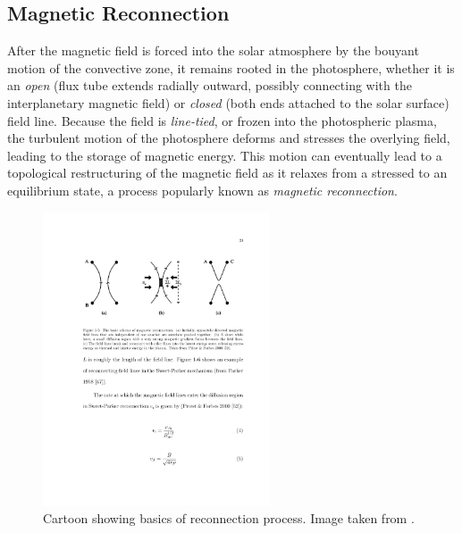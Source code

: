\subsection{Magnetic Reconnection}
\label{subsec:magnetic_reconnection}
\par After the magnetic field is forced into the solar atmosphere by the bouyant motion of the convective zone, it remains rooted in the photosphere, whether it is an \textit{open} (flux tube extends radially outward, possibly connecting with the interplanetary magnetic field) or \textit{closed} (both ends attached to the solar surface) field line. Because the field is \textit{line-tied}, or frozen into the photospheric plasma, the turbulent motion of the photosphere deforms and stresses the overlying field, leading to the storage of magnetic energy. This motion can eventually lead to a topological restructuring of the magnetic field as it relaxes from a stressed to an equilibrium state, a process popularly known as \textit{magnetic reconnection}.
%
\begin{figure}[htbp]
	\centering
	\includegraphics[width=0.6\textwidth]{figures/reconnection_cartoon.pdf}
	\caption{Cartoon showing basics of reconnection process. Image taken from \citet{priest_magnetic_2000}.}
	\label{fig:reconnection}
\end{figure}
%
